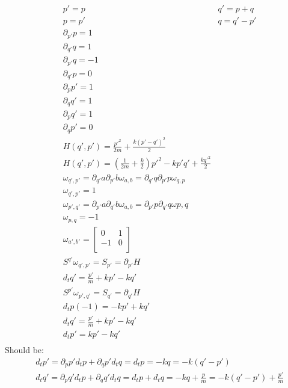 \documentclass[aps,pra,10pt,twocolumn,floatfix,nofootinbib]{revtex4-1}
\theoremstyle{definition}
\begin{document}
\begin{align*}
&p' = p &q' = p+q \\
&p = p' &q = q'-p' \\
&\partial_{p'}p=1 \\
&\partial_{q'}q=1 \\
&\partial_{p'}q=-1 \\
&\partial_{q'}p=0 \\
&\partial_{p}p'=1 \\
&\partial_{q}q'=1 \\
&\partial_{p}q'=1 \\
&\partial_{q}p'=0 \\
&H(q',p') = \frac{p'^2}{2m} + \frac{k(p' - q')^{2}}{2}  \\
&H(q',p') = (\frac{1}{2m}+\frac{k}{2})p'^2 - kp'q' + \frac{kq'^{2}}{2}  \\
&\omega_{q',p'} = \partial_{q'}a \partial_{p'}b \omega_{a,b} = \partial_{q'}q \partial_{p'}p \omega_{q,p} \\
&\omega_{q',p'} = 1 \\
&\omega_{p',q'} = \partial_{p'}a \partial_{q'}b \omega_{a,b} = \partial_{p'}p \partial_{q'}q \omega{p,q} \\
&\omega_{p,q} = -1 \\
&\omega_{a', b'} =  \left[
  \begin{array}{cc}
    0 & 1 \\
    -1 & 0 \\
  \end{array}
\right] \\
&S^{q'} \omega_{q', p'} = S_{p'} = \partial_{p'} H \\
&d_tq' = \frac{p'}{m} +kp' -kq' \\
&S^{p'} \omega_{p', q'} = S_{q'} = \partial_{q'} H \\
&d_tp (-1) = -kp' +kq' \\
&d_tq' = \frac{p'}{m} +kp' -kq' \\
&d_tp' = kp' -kq' \\
\end{align*}
Should be:
\begin{align*}
&d_tp'=\partial_pp'd_tp + \partial_qp'd_tq=d_tp= -kq=-k(q'-p') \\
&d_tq'=\partial_pq'd_tp + \partial_qq'd_tq=d_tp +d_tq=-kq + \frac{p}{m}=-k(q'-p')+ \frac{p'}{m}
\end{align*}
\end{document}
